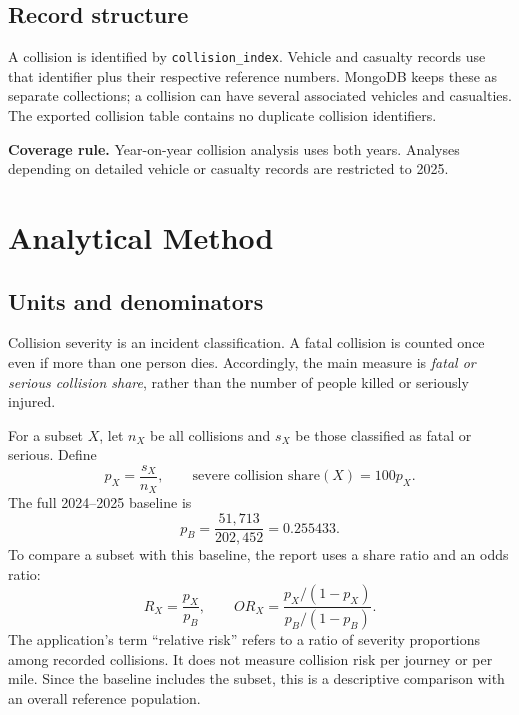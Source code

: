 \documentclass[11pt,a4paper]{article}
\begin{document}
\subsection{Record structure}
A collision is identified by \texttt{collision\_index}. Vehicle and casualty records use that identifier plus their respective reference numbers. MongoDB keeps these as separate collections; a collision can have several associated vehicles and casualties. The exported collision table contains no duplicate collision identifiers.

\textbf{Coverage rule.} Year-on-year collision analysis uses both years. Analyses depending on detailed vehicle or casualty records are restricted to 2025.
\clearpage
\section{Analytical Method}
\subsection{Units and denominators}
Collision severity is an incident classification. A fatal collision is counted once even if more than one person dies. Accordingly, the main measure is \emph{fatal or serious collision share}, rather than the number of people killed or seriously injured.

For a subset $X$, let $n_X$ be all collisions and $s_X$ be those classified as fatal or serious. Define
\begin{equation}
p_X=\frac{s_X}{n_X}, \qquad \text{severe collision share}(X)=100p_X.
\end{equation}
The full 2024--2025 baseline is
\begin{equation}p_B=\frac{51,713}{202,452}=0.255433.\end{equation}
To compare a subset with this baseline, the report uses a share ratio and an odds ratio:
\begin{equation}
R_X=\frac{p_X}{p_B}, \qquad OR_X=\frac{p_X/(1-p_X)}{p_B/(1-p_B)}.
\end{equation}
The application's term ``relative risk'' refers to a ratio of severity proportions among recorded collisions. It does not measure collision risk per journey or per mile. Since the baseline includes the subset, this is a descriptive comparison with an overall reference population.
\end{document}
